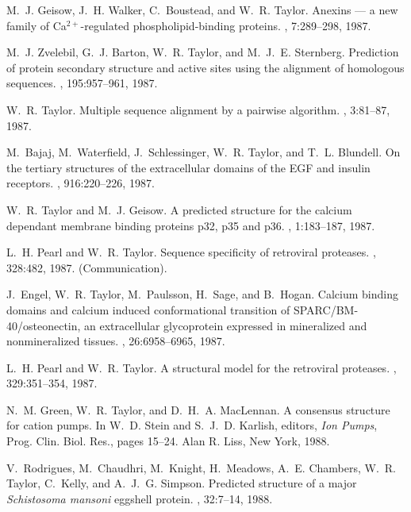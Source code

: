 \begin{thebibliography}{100}
M.~J. Geisow, J.~H. Walker, C.~Boustead, and W.~R. Taylor.
\newblock Anexins --- a new family of {C}a$^{2+}$-regulated
  phospholipid-binding proteins.
, 7:289--298, 1987.

M.~J. Zvelebil, G.~J. Barton, W.~R. Taylor, and M.~J.~E. Sternberg.
\newblock Prediction of protein secondary structure and active sites using the
  alignment of homologous sequences.
, 195:957--961, 1987.

W.~R. Taylor.
\newblock Multiple sequence alignment by a pairwise algorithm.
, 3:81--87, 1987.

M.~Bajaj, M.~Waterfield, J.~Schlessinger, W.~R. Taylor, and T.~L. Blundell.
\newblock On the tertiary structures of the extracellular domains of the {EGF}
  and insulin receptors.
, 916:220--226, 1987.

W.~R. Taylor and M.~J. Geisow.
\newblock A predicted structure for the calcium dependant membrane binding
  proteins p32, p35 and p36.
, 1:183--187, 1987.

L.~H. Pearl and W.~R. Taylor.
\newblock Sequence specificity of retroviral proteases.
, 328:482, 1987.
\newblock (Communication).

J.~Engel, W.~R. Taylor, M.~Paulsson, H.~Sage, and B.~Hogan.
\newblock Calcium binding domains and calcium induced conformational transition
  of {SPARC/BM-40/osteonectin}, an extracellular glycoprotein expressed in
  mineralized and nonmineralized tissues.
, 26:6958--6965, 1987.

L.~H. Pearl and W.~R. Taylor.
\newblock A structural model for the retroviral proteases.
, 329:351--354, 1987.

N.~M. Green, W.~R. Taylor, and D.~H.~A. MacLennan.
\newblock A consensus structure for cation pumps.
\newblock In W.~D. Stein and S.~J.~D. Karlish, editors, {\em Ion Pumps}, Prog.
  Clin. Biol. Res., pages 15--24. Alan R. Liss, New York, 1988.

V.~Rodrigues, M.~Chaudhri, M.~Knight, H.~Meadows, A.~E. Chambers, W.~R. Taylor,
  C.~Kelly, and A.~J.~G. Simpson.
\newblock Predicted structure of a major {{\em Schistosoma mansoni}} eggshell
  protein.
, 32:7--14, 1988.


\end{thebibliography}
